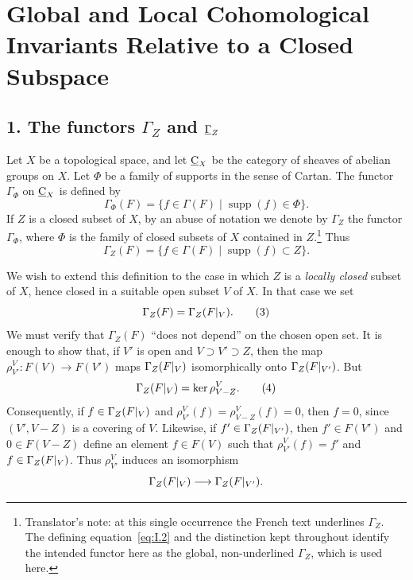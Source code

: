 
\makeatletter
\providecommand{\sgareaderlabel}[2]{%
  \begingroup
  \def\@currentlabel{#2}%
  \phantomsection\label{#1}%
  \endgroup}
\makeatother

\chapter[Global and Local Cohomological Invariants]
{Global and Local Cohomological Invariants Relative to a Closed Subspace}
\label{I}

\section*{1. The functors $\Gamma_Z$ and $\mathop{\underline{\Gamma}}\nolimits_Z$}
\sgareaderlabel{I.1}{1}

Let $X$ be a topological space, and let $\underline{\mathrm C}_X$ be the category of
sheaves of abelian groups on $X$.  Let $\Phi$ be a family of supports in
the sense of Cartan.  The functor $\Gamma_\Phi$ on $\underline{\mathrm C}_X$ is defined by
\begin{equation}
  \Gamma_\Phi(F)
  =\{f\in\Gamma(F)\mid \operatorname{supp}(f)\in\Phi\}.
  \tag{1}\label{eq:I.1}
\end{equation}
If $Z$ is a closed subset of $X$, by an abuse of notation we denote by
$\Gamma_Z$ the functor $\Gamma_\Phi$, where $\Phi$ is the family of
closed subsets of $X$ contained in $Z$.\footnote{Translator's note: at this single occurrence
the French text underlines $\Gamma_Z$. The defining
equation~\eqref{eq:I.2} and the distinction kept throughout
identify the intended functor here as the global, non-underlined $\Gamma_Z$,
which is used here.}
Thus
\begin{equation}
  \Gamma_Z(F)
  =\{f\in\Gamma(F)\mid \operatorname{supp}(f)\subset Z\}.
  \tag{2}\label{eq:I.2}
\end{equation}

We wish to extend this definition to the case in which $Z$ is a
\emph{locally closed} subset of $X$, hence closed in a suitable open subset
$V$ of $X$.  In that case we set
\begin{equation}
  \Gamma_Z(F)=\Gamma_Z(F\vert_{V}).
  \tag{3}\label{eq:I.3}
\end{equation}
We must verify that $\Gamma_Z(F)$ ``does not depend'' on the chosen open
set.  It is enough to show that, if $V'$ is open and
$V\supset V'\supset Z$, then the map
$\rho^V_{V'}:F(V)\to F(V')$ maps
$\Gamma_Z(F\vert_{V})$ isomorphically onto
$\Gamma_Z(F\vert_{V'})$.  But
\begin{equation}
  \Gamma_Z(F\vert_{V})=\ker\rho^V_{V-Z}.
  \tag{4}\label{eq:I.4}
\end{equation}
Consequently, if $f\in\Gamma_Z(F\vert_{V})$ and
$\rho^V_{V'}(f)=\rho^V_{V-Z}(f)=0$, then $f=0$, since
$(V',V-Z)$ is a covering of $V$.  Likewise, if
$f'\in\Gamma_Z(F\vert_{V'})$, then $f'\in F(V')$ and
$0\in F(V-Z)$ define an element $f\in F(V)$ such that
$\rho^V_{V'}(f)=f'$ and $f\in\Gamma_Z(F\vert_{V})$.
Thus $\rho^V_{V'}$ induces an isomorphism
\[
  \Gamma_Z(F\vert_{V})\longrightarrow
  \Gamma_Z(F\vert_{V'}).
\]

